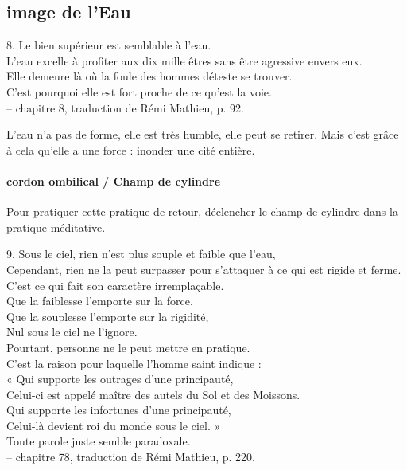 \subsection{image de l'Eau}
\begin{singlequote}
    8.	Le bien supérieur est semblable à l’eau.\\
L’eau excelle à profiter aux dix mille êtres sans être agressive envers eux. \\ Elle demeure là où la foule des hommes déteste se trouver.\\
C’est pourquoi elle est fort proche de ce qu’est la voie.\\
-- chapitre 8, traduction de Rémi Mathieu, p. 92.
\end{singlequote}

L'eau n'a pas de forme, elle est très humble, elle peut se retirer. Mais c'est grâce à cela qu'elle a une force : inonder une cité entière.


\paragraph{cordon ombilical / Champ de cylindre} Pour pratiquer cette pratique de retour, déclencher le champ de cylindre dans la pratique méditative.
\begin{singlequote}
    9.	Sous le ciel, rien n’est plus souple et faible que l’eau,\\
Cependant, rien ne la peut surpasser pour s’attaquer à ce qui est rigide et ferme. \\C’est ce qui fait son caractère irremplaçable.\\
Que la faiblesse l’emporte sur la force, \\Que la souplesse l’emporte sur la rigidité, \\Nul sous le ciel ne l’ignore.\\
Pourtant, personne ne le peut mettre en pratique. \\C’est la raison pour laquelle l’homme saint indique :\\
« Qui supporte les outrages d’une principauté,\\
Celui-ci est appelé maître des autels du Sol et des Moissons.\\ Qui supporte les infortunes d’une principauté,\\
Celui-là devient roi du monde sous le ciel. » \\Toute parole juste semble paradoxale.\\
-- chapitre 78, traduction de Rémi Mathieu, p. 220.
\end{singlequote}


